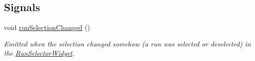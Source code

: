 \subsection*{Signals}
\begin{DoxyCompactItemize}
\item 
\hypertarget{class_picto_1_1_run_selector_widget_a49bd945e717287fefe6efe75f1c6b7fb}{void \hyperlink{class_picto_1_1_run_selector_widget_a49bd945e717287fefe6efe75f1c6b7fb}{run\-Selection\-Changed} ()}\label{class_picto_1_1_run_selector_widget_a49bd945e717287fefe6efe75f1c6b7fb}

\begin{DoxyCompactList}\small\item\em Emitted when the selection changed somehow (a run was selected or deselected) in the \hyperlink{class_picto_1_1_run_selector_widget}{Run\-Selector\-Widget}. \end{DoxyCompactList}\end{DoxyCompactItemize}
